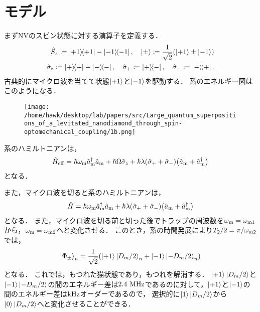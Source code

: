 \documentclass{report}
\begin{document}
  \section{モデル}
    まずNVのスピン状態に対する演算子を定義する．
    \begin{align}
      \hat{S}_z \coloneqq \ketbra{+1}{+1} - \ketbra{-1}{-1},\quad \ket{\pm} \coloneqq \frac{1}{\sqrt{2}}\qty(\ket{+1} \pm \ket{-1})\\ 
      \hat{\sigma}_z \coloneqq \ketbra{+}{+} - \ketbra{-}{-},\quad \hat{\sigma}_+ \coloneqq \ketbra{+}{-},\quad \hat{\sigma}_- \coloneqq \ketbra{-}{+}.
    \end{align}
    古典的にマイクロ波を当てて状態$\ket{+1}$と$\ket{-1}$を駆動する．
    系のエネルギー図はこのようになる．
    \begin{figure}[H]
      \centering
      \texttt{[image: /home/hawk/desktop/lab/papers/src/Large\_quantum\_superpositions\_of\_a\_levitated\_nanodiamond\_through\_spin-optomechanical\_coupling/1b.png]}
    \end{figure}
    系のハミルトニアンは，
    \begin{align}
      \hat{H}_{\mathrm{eff}} = \hbar\omega_{\mathrm{m}}\hat{a}^{\dag}_{\mathrm{m}}\hat{a}_{\mathrm{m}} + \hbar\Omega\hat{\sigma}_z + \hbar\lambda\qty(\hat{\sigma}_+ + \hat{\sigma}_-)\qty(\hat{a}_{\mathrm{m}} + \hat{a}^{\dag}_{\mathrm{m}})
    \end{align}
    となる．
    \par
    また，マイクロ波を切ると系のハミルトニアンは，
    \begin{align}
      \hat{H} = \hbar\omega_{\mathrm{m}}\hat{a}^{\dag}_{\mathrm{m}}\hat{a}_{\mathrm{m}} + \hbar\lambda\qty(\hat{\sigma}_+ + \hat{\sigma}_-)\qty(\hat{a}_{\mathrm{m}} + \hat{a}^{\dag}_{\mathrm{m}})
    \end{align}
    となる．
    また，マイクロ波を切る前と切った後でトラップの周波数を$\omega_{\mathrm{m}} = \omega_{\mathrm{m}1}$から，$\omega_{\mathrm{m}} = \omega_{\mathrm{m}2}$へと変化させる．
    このとき，系の時間発展により$T_2 / 2 = \pi / \omega_{\mathrm{m}2}$では，
    \begin{align}
      \ket{\Phi_{\pm}}_{n} = \frac{1}{\sqrt{2}}\qty(\ket{+1}\ket{D_m / 2}_{n} + \ket{-1}\ket{-D_m / 2}_{n})
    \end{align}
    となる．
    これでは，もつれた猫状態であり，もつれを解消する．
    $\ket{+1}\ket{D_m / 2}$と$\ket{-1}\ket{-D_m / 2}$の間のエネルギー差は$2.4\ \r{MHz}$であるのに対して，$\ket{+1}$と$\ket{-1}$の間のエネルギー差は$\mathrm{kHz}$オーダーであるので，
    選択的に$\ket{1}\ket{D_m / 2}$から$\ket{0}\ket{D_m / 2}$へと変化させることができる．
\end{document}
